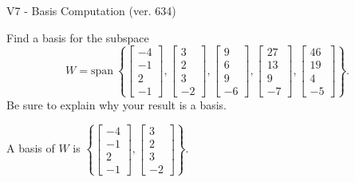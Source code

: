 \begin{exercise}
  \begin{exerciseTitle}V7 - Basis Computation (ver. 634)\end{exerciseTitle}
  \begin{exerciseStatement}
    Find a basis for the subspace 
\[W=\mathrm{span}\ \left\{\left[\begin{array}{r}
-4 \\
-1 \\
2 \\
-1
\end{array}\right] , \left[\begin{array}{r}
3 \\
2 \\
3 \\
-2
\end{array}\right] , \left[\begin{array}{r}
9 \\
6 \\
9 \\
-6
\end{array}\right] , \left[\begin{array}{r}
27 \\
13 \\
9 \\
-7
\end{array}\right] , \left[\begin{array}{r}
46 \\
19 \\
4 \\
-5
\end{array}\right]\right\}.\]
 Be sure to explain why your result is a basis.


  \end{exerciseStatement}
  \begin{exerciseAnswer}
   A basis of \(W\) is  \(\left\{\left[\begin{array}{r}
-4 \\
-1 \\
2 \\
-1
\end{array}\right] , \left[\begin{array}{r}
3 \\
2 \\
3 \\
-2
\end{array}\right]\right\}\).
  


  \end{exerciseAnswer}
\end{exercise}